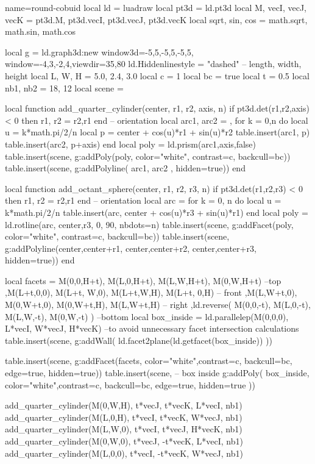 \documentclass{standalone}
\begin{document}
\begin{luadraw}{name=round-cobuid}
local ld = luadraw
local pt3d = ld.pt3d
local M, vecI, vecJ, vecK = pt3d.M, pt3d.vecI, pt3d.vecJ, pt3d.vecK
local sqrt, sin, cos = math.sqrt, math.sin, math.cos

local g = ld.graph3d:new{
  window3d={-5,5,-5,5,-5,5},
  window={-4,3,-2,4},viewdir={35,80}
}
ld.Hiddenlinestyle = "dashed"
-- length, width, height
local L, W, H = 5.0, 2.4, 3.0
local c = 1
local bc = true
local t = 0.5
local nb1, nb2 = 18, 12
local scene = {}

local function add_quarter_cylinder(center, r1, r2, axis, n)
  if pt3d.det(r1,r2,axis) < 0 then r1, r2 = r2,r1 end -- orientation
  local arc1, arc2 = {}, {}
  for k = 0,n do
    local u = k*math.pi/2/n
    local p = center + cos(u)*r1 + sin(u)*r2
    table.insert(arc1, p)
    table.insert(arc2, p+axis)
  end
  local poly = ld.prism(arc1,axis,false)
  table.insert(scene, g:addPoly(poly, {color="white", contrast=c, backcull=bc}))
  table.insert(scene, g:addPolyline( {arc1, arc2 }, {hidden=true}))
end

local function add_octant_sphere(center, r1, r2, r3, n)
    if pt3d.det(r1,r2,r3) < 0 then r1, r2 = r2,r1 end -- orientation
    local arc = {}
    for k = 0, n do
        local u = k*math.pi/2/n
        table.insert(arc, center + cos(u)*r3 + sin(u)*r1)
    end
    local poly = ld.rotline(arc, {center,r3}, 0, 90, {nbdots=n})
    table.insert(scene, g:addFacet(poly, {color="white", contrast=c, backcull=bc}))
    table.insert(scene, g:addPolyline({{center,center+r1}, {center,center+r2}, 
        {center,center+r3}}, {hidden=true}))
end

local facets = {
  {M(0,0,H+t), M(L,0,H+t), M(L,W,H+t), M(0,W,H+t)} --top
  ,{M(L+t,0,0), M(L+t, W,0), M(L+t,W,H), M(L+t, 0,H)} -- front
  ,{M(L,W+t,0), M(0,W+t,0), M(0,W+t,H), M(L,W+t,H)} -- right
  ,ld.reverse( {M(0,0,-t), M(L,0,-t), M(L,W,-t), M(0,W,-t)} ) --bottom
}
local box_inside = ld.parallelep(M(0,0,0), L*vecI, W*vecJ, H*vecK)
--to avoid unnecessary facet intersection calculations
table.insert(scene, g:addWall( ld.facet2plane(ld.getfacet(box_inside)) ))

table.insert(scene, g:addFacet(facets, {color="white",contrast=c, backcull=bc, edge=true, hidden=true}))
table.insert(scene, -- box inside
    g:addPoly( box_inside,{ color="white",contrast=c, backcull=bc, edge=true, hidden=true }))

add_quarter_cylinder(M(0,W,H), t*vecJ, t*vecK, L*vecI, nb1)
add_quarter_cylinder(M(L,0,H), t*vecI, t*vecK, W*vecJ, nb1)
add_quarter_cylinder(M(L,W,0), t*vecI, t*vecJ, H*vecK, nb1)
add_quarter_cylinder(M(0,W,0), t*vecJ, -t*vecK, L*vecI, nb1)
add_quarter_cylinder(M(L,0,0), t*vecI, -t*vecK, W*vecJ, nb1)


\end{luadraw}
\end{document}
